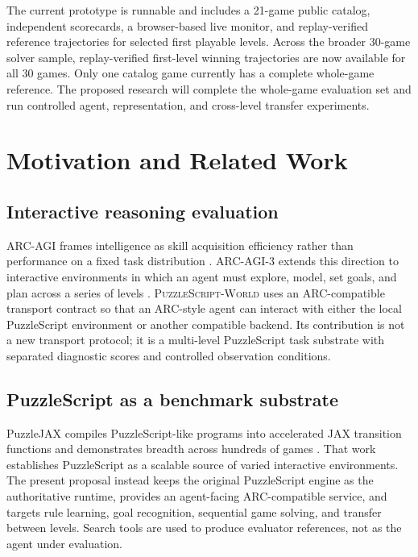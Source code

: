 \documentclass[a4paper,11pt]{article}
\newcommand{\benchmarkname}{\textsc{PuzzleScript-World}}
\begin{document}
The current prototype is runnable and includes a 21-game public catalog,
independent scorecards, a browser-based live monitor, and replay-verified
reference trajectories for selected first playable levels. Across the broader
30-game solver sample, replay-verified first-level winning trajectories are now
available for all 30 games. Only one catalog game currently has a complete
whole-game reference. The proposed research will complete the whole-game
evaluation set and run controlled agent, representation, and cross-level
transfer experiments.

\section{Motivation and Related Work}

\subsection{Interactive reasoning evaluation}

ARC-AGI frames intelligence as skill acquisition efficiency rather than
performance on a fixed task distribution \cite{chollet2019measure}. ARC-AGI-3
extends this direction to interactive environments in which an agent must
explore, model, set goals, and plan across a series of levels
\cite{arcprize2026arcagi3}. \benchmarkname{} uses an ARC-compatible transport
contract so that an ARC-style agent can interact with either the local
PuzzleScript environment or another compatible backend. Its contribution is
not a new transport protocol; it is a multi-level PuzzleScript task substrate
with separated diagnostic scores and controlled observation conditions.

\subsection{PuzzleScript as a benchmark substrate}

PuzzleJAX compiles PuzzleScript-like programs into accelerated JAX transition
functions and demonstrates breadth across hundreds of games
\cite{earle2025puzzlejax}. That work establishes PuzzleScript as a scalable
source of varied interactive environments. The present proposal instead keeps
the original PuzzleScript engine as the authoritative runtime, provides an
agent-facing ARC-compatible service, and targets rule learning, goal
recognition, sequential game solving, and transfer between levels. Search tools
are used to produce evaluator references, not as the agent under evaluation.
\end{document}
